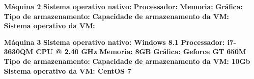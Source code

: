 \textbf{Máquina 2}
\textbf{Sistema operativo nativo:} \textit{}
\textbf{Processador:} \textit{}
\textbf{Memoria:} \textit{}
\textbf{Gráfica:} \textit{}
\textbf{Tipo de armazenamento:} \textit{}
\textbf{Capacidade de armazenamento da VM:} \textit{}
\textbf{Sistema operativo da VM:} \textit{}

\textbf{Máquina 3}
\textbf{Sistema operativo nativo: Windows 8.1} \textit{}
\textbf{Processador: i7-3630QM CPU @ 2.40 GHz} \textit{}
\textbf{Memoria: 8GB} \textit{}
\textbf{Gráfica: Geforce GT 650M} \textit{}
\textbf{Tipo de armazenamento:} \textit{}
\textbf{Capacidade de armazenamento da VM: 10Gb} \textit{}
\textbf{Sistema operativo da VM: CentOS 7} \textit{}
